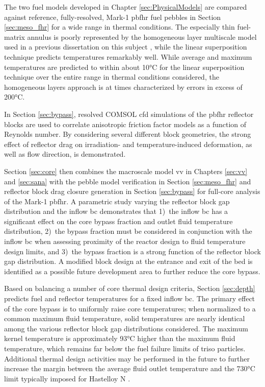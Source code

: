 The two fuel models developed in Chapter \ref{sec:PhysicalModels} are compared against reference, fully-resolved, Mark-1 \gls{pbfhr} fuel pebbles in Section \ref{sec:meso_fhr} for a wide range in thermal conditions. The especially thin fuel-matrix annulus is poorly represented by the homogeneous layer multiscale model used in a previous dissertation on this subject \cite{xin_wang_thesis}, while the linear superposition technique predicts temperatures remarkably well. While average and maximum temperatures are predicted to within about 10\si{\celsius} for the linear superposition technique over the entire range in thermal conditions considered, the homogeneous layers approach is at times characterized by errors in excess of 200\si{\celsius}.

In Section \ref{sec:bypass}, resolved COMSOL \gls{cfd} simulations of the \gls{pbfhr} reflector blocks are used to correlate anisotropic friction factor models as a function of Reynolds number. By considering several different block geometries, the strong effect of reflector drag on irradiation- and temperature-induced deformation, as well as flow direction, is demonstrated.

Section \ref{sec:core} then combines the macroscale model \gls{vv} in Chapters \ref{sec:vv} and \ref{sec:sana} with the pebble model verification in Section \ref{sec:meso_fhr} and reflector block drag closure generation in Section \ref{sec:bypass} for full-core analysis of the Mark-1 \gls{pbfhr}. A parametric study varying the reflector block gap distribution and the inflow \gls{bc} demonstrates that 1)~the inflow \gls{bc} has a significant effect on the core bypass fraction and outlet fluid temperature distribution, 2)~the bypass fraction must be considered in conjunction with the inflow \gls{bc} when assessing proximity of the reactor design to fluid temperature design limits, and 3)~the bypass fraction is a strong function of the reflector block gap distribution. A modified block design at the entrance and exit of the bed is identified as a possible future development area to further reduce the core bypass.

Based on balancing a number of core thermal design criteria, Section \ref{sec:depth} predicts fuel and reflector temperatures for a fixed inflow \gls{bc}. The primary effect of the core bypass is to uniformly raise core temperatures; when normalized to a common maximum fluid temperature, solid temperatures are nearly identical among the various reflector block gap distributions considered. The maximum kernel temperature is approximately 93\si{\celsius} higher than the maximum fluid temperature, which remains far below the fuel failure limits of \gls{triso} particles. Additional thermal design activities may be performed in the future to further increase the margin between the average fluid outlet temperature and the 730\si{\celsius} limit typically imposed for Hastelloy N \cite{xiao}.

